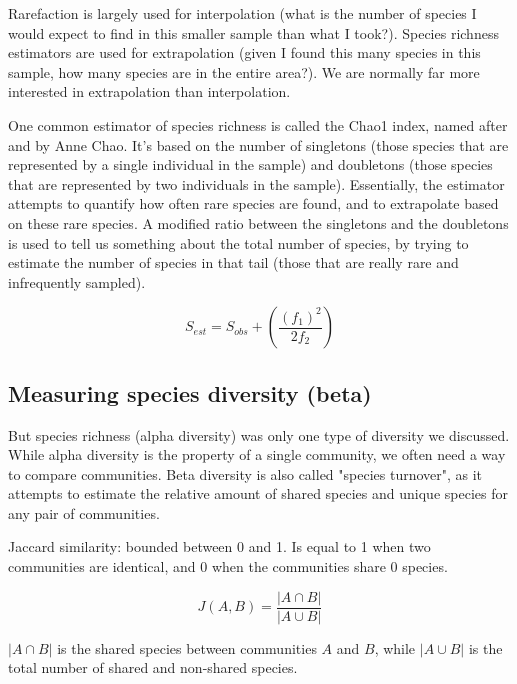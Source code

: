 \documentclass[12pt]{article}
\begin{document}
Rarefaction is largely used for interpolation (what is the number of species I would expect to find in this smaller sample than what I took?). Species richness estimators are used for extrapolation (given I found this many species in this sample, how many species are in the entire area?). We are normally far more interested in extrapolation than interpolation. 

One common estimator of species richness is called the Chao1 index, named after and by Anne Chao. It's based on the number of singletons (those species that are represented by a single individual in the sample) and doubletons (those species that are represented by two individuals in the sample). Essentially, the estimator attempts to quantify how often rare species are found, and to extrapolate based on these rare species. A modified ratio between the singletons and the doubletons is used to tell us something about the total number of species, by trying to estimate the number of species in that tail (those that are really rare and infrequently sampled). 


\[ S_{est} = S_{obs} + \left( \frac{(f_{1})^{2}}{2f_{2}}\right)\]



















\subsection*{Measuring species diversity (beta)}

But species richness (alpha diversity) was only one type of diversity we discussed. While alpha diversity is the property of a single community, we often need a way to compare communities. Beta diversity is also called "species turnover", as it attempts to estimate the relative amount of shared species and unique species for any pair of communities. 


Jaccard similarity: bounded between 0 and 1. Is equal to 1 when two communities are identical, and 0 when the communities share 0 species. 


\[ J(A,B) =  \frac{| A \cap	 B |}{| A \cup B|} \]


$| A \cap	 B |$ is the shared species between communities $A$ and $B$, while $| A \cup B |$ is the total number of shared and non-shared species. 
\end{document}
